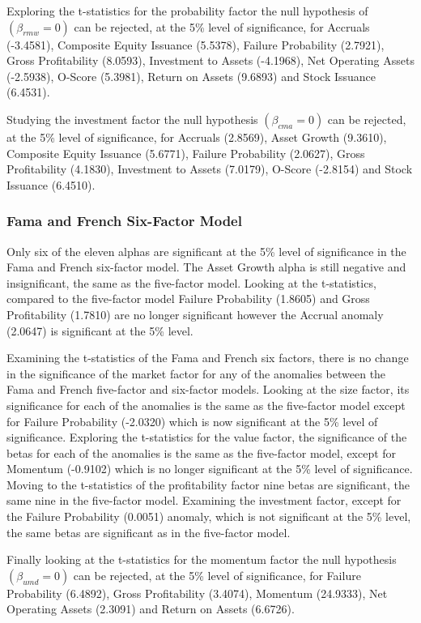 \documentclass[12pt, a4paper, oneside]{article}
\begin{document}
Exploring the t-statistics for the probability factor the null hypothesis of $(\beta_{rmw}= 0)$ can be rejected, at the 5\% level of significance, for Accruals (-3.4581), Composite Equity Issuance (5.5378), Failure Probability (2.7921), Gross Profitability (8.0593), Investment to Assets (-4.1968), Net Operating Assets (-2.5938), O-Score (5.3981), Return on Assets (9.6893) and Stock Issuance (6.4531).

Studying the investment factor the null hypothesis $(\beta_{cma}= 0)$ can be rejected, at the 5\% level of significance, for Accruals (2.8569), Asset Growth (9.3610), Composite Equity Issuance (5.6771), Failure Probability (2.0627), Gross Profitability (4.1830), Investment to Assets (7.0179), O-Score (-2.8154) and Stock Issuance (6.4510).

\subsubsection{Fama and French Six-Factor Model}
Only six of the eleven alphas are significant at the 5\% level of significance in the Fama and French six-factor model. The Asset Growth alpha is still negative and insignificant, the same as the five-factor model. Looking at the t-statistics, compared to the five-factor model Failure Probability (1.8605) and Gross Profitability (1.7810) are no longer significant however the Accrual anomaly (2.0647) is significant at the 5\% level.

Examining the t-statistics of the Fama and French six factors, there is no change in the significance of the market factor for any of the anomalies between the Fama and French five-factor and six-factor models. Looking at the size factor, its significance for each of the anomalies is the same as the five-factor model except for Failure Probability (-2.0320) which is now significant at the 5\% level of significance. Exploring the t-statistics for the value factor, the significance of the betas for each of the anomalies is the same as the five-factor model, except for Momentum (-0.9102) which is no longer significant at the 5\% level of significance. Moving to the t-statistics of the profitability factor nine betas are significant, the same nine in the five-factor model. Examining the investment factor, except for the Failure Probability (0.0051) anomaly, which is not significant at the 5\% level, the same betas are significant as in the five-factor model.

Finally looking at the t-statistics for the momentum factor the null hypothesis $(\beta_{umd}= 0)$ can be rejected, at the 5\% level of significance, for Failure Probability (6.4892), Gross Profitability (3.4074), Momentum (24.9333), Net Operating Assets (2.3091) and Return on Assets (6.6726).
\end{document}
